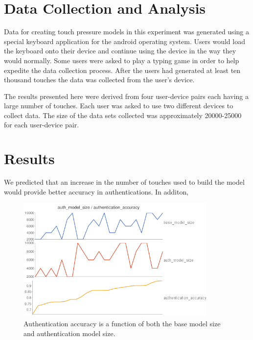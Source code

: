\documentclass{acm_proc_article-sp}
\begin{document}
\section{Data Collection and Analysis}
\label{sec:data_collection}
Data for creating touch pressure models in this experiment was generated using a special keyboard application for the android operating system. Users would load the keyboard onto their device and continue using the device in the way they would normally. Some users were asked to play a typing game in order to help expedite the data collection process. After the users had generated at least ten thousand touches the data was collected from the user's device.

The results presented here were derived from four user-device pairs each having a large number of touches.
Each user was asked to use two different devices to collect data.
The size of the data sets collected was approximately 20000-25000 for each user-device pair.



\section{Results}
\label{sec:results}
We predicted that an increase in the number of touches used to build the model would provide better accuracy in authentications. 
In additon,

\begin{figure}
\centering
\includegraphics[width=3.9in]{authentication_accuracy_vs_model_size.png}
\caption{Authentication accuracy is a function of both the base model size and authentication model size.}
\label{fig:authentication_accuracy}
\end{figure}
\end{document}

